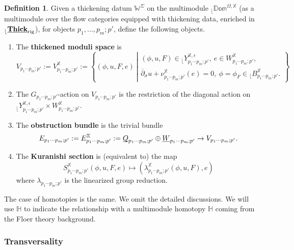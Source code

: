 \documentclass[reqno, 10pt]{amsart}
\numberwithin{equation}{section}
\numberwithin{equation}{section}
\theoremstyle{definition}
\newtheorem{defn}[thm]{Definition}
\theoremstyle{remark}
\newcommand{\beqn}{\begin{equation*}}
\newcommand{\eeqn}{\end{equation*}}
\newcommand{\ov}{\overline}
\newcommand{\mb}{\mathbb}
\renewcommand{\outer}{{}_{\lfloor}}
\newcommand{\uds}[1]{\underline{\smash{#1}}}
\begin{document}
\begin{defn}\label{defn_module_thickening}
Given a thickening datum $\mb{W}^\Sigma$ on the multimodule $\outer \mb{Dom}^{\Omega, {\mb X}}$ (as a multimodule over the flow categories equipped with thickening data, enriched in $\outer \uds{\bf Thick}_{\rm rig}$), for objects $p_1, \ldots, p_m; p'$, define the following objects.

\begin{enumerate}
    \item The {\bf thickened moduli space} is 
    \beqn
    V_{p_1 \cdots p_m; p'}:= V_{p_1 \cdots p_m; p'}^{\mb X}:= \left\{ (\phi, u, F, e)\ \left| \begin{array}{l}  (\phi, u, F) \in \outer Y_{p_1 \cdots p_m; p'}^{{\mb X}, \epsilon},\ e \in W_{p_1 \cdots p_m; p'}^{\mb X},\\
    \ov\partial_\sigma u + \nu_{p_1 \cdots p_m; p'}^{\mb X} (e) = 0,\ \phi = \phi_F \in \outer B_{p_1 \cdots p_m; p'}^{\mb{X}}. \end{array} \right.  \right\}
\eeqn


\item The $G_{p_1 \cdots p_m; p'}$-action on $V_{p_1 \cdots p_m; p'}$ is the restriction of the diagonal action on $\outer Y_{p_1 \cdots p_m; p'}^{\mb{X}, \epsilon} \times W_{p_1 \cdots p_m; p'}^{\mb X}$. 

\item The {\bf obstruction bundle} is the trivial bundle
\beqn
E_{p_1 \cdots p_m; p'}:=E_{p_1 \cdots p_m; p'}^{\mb X}:=  \uds Q_{p_1 \cdots p_m; p'} \oplus \uds W_{p_1 \cdots p_m; p'} \to V_{p_1 \cdots p_m; p'}.
\eeqn


\item The {\bf Kuranishi section} is (equivalent to) the map
\beqn
S_{p_1\cdots p_m; p'}^{\mb X} (\phi, u, F, e) \mapsto (\lambda_{p_1 \cdots p_m; p'}^{\mb X} (\phi, u, F), e)
\eeqn
where $\lambda_{p_1 \cdots p_m; p'}$ is the linearized group reduction. 
\end{enumerate}
\end{defn}

The case of homotopies is the same. We omit the detailed discussions. We will use ${\mb H}$ to indicate the relationship with a multimodule homotopy ${\mb H}$ coming from the Floer theory background.

\subsubsection{Transversality}
\end{document}
